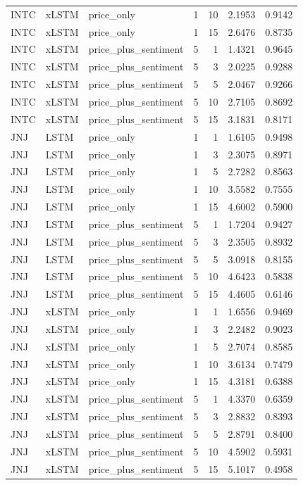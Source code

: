 \begin{longtable}{lllrrrr}
INTC & xLSTM & price_only & 1 & 10 & 2.1953 & 0.9142 \\
INTC & xLSTM & price_only & 1 & 15 & 2.6476 & 0.8735 \\
INTC & xLSTM & price_plus_sentiment & 5 & 1 & 1.4321 & 0.9645 \\
INTC & xLSTM & price_plus_sentiment & 5 & 3 & 2.0225 & 0.9288 \\
INTC & xLSTM & price_plus_sentiment & 5 & 5 & 2.0467 & 0.9266 \\
INTC & xLSTM & price_plus_sentiment & 5 & 10 & 2.7105 & 0.8692 \\
INTC & xLSTM & price_plus_sentiment & 5 & 15 & 3.1831 & 0.8171 \\
JNJ & LSTM & price_only & 1 & 1 & 1.6105 & 0.9498 \\
JNJ & LSTM & price_only & 1 & 3 & 2.3075 & 0.8971 \\
JNJ & LSTM & price_only & 1 & 5 & 2.7282 & 0.8563 \\
JNJ & LSTM & price_only & 1 & 10 & 3.5582 & 0.7555 \\
JNJ & LSTM & price_only & 1 & 15 & 4.6002 & 0.5900 \\
JNJ & LSTM & price_plus_sentiment & 5 & 1 & 1.7204 & 0.9427 \\
JNJ & LSTM & price_plus_sentiment & 5 & 3 & 2.3505 & 0.8932 \\
JNJ & LSTM & price_plus_sentiment & 5 & 5 & 3.0918 & 0.8155 \\
JNJ & LSTM & price_plus_sentiment & 5 & 10 & 4.6423 & 0.5838 \\
JNJ & LSTM & price_plus_sentiment & 5 & 15 & 4.4605 & 0.6146 \\
JNJ & xLSTM & price_only & 1 & 1 & 1.6556 & 0.9469 \\
JNJ & xLSTM & price_only & 1 & 3 & 2.2482 & 0.9023 \\
JNJ & xLSTM & price_only & 1 & 5 & 2.7074 & 0.8585 \\
JNJ & xLSTM & price_only & 1 & 10 & 3.6134 & 0.7479 \\
JNJ & xLSTM & price_only & 1 & 15 & 4.3181 & 0.6388 \\
JNJ & xLSTM & price_plus_sentiment & 5 & 1 & 4.3370 & 0.6359 \\
JNJ & xLSTM & price_plus_sentiment & 5 & 3 & 2.8832 & 0.8393 \\
JNJ & xLSTM & price_plus_sentiment & 5 & 5 & 2.8791 & 0.8400 \\
JNJ & xLSTM & price_plus_sentiment & 5 & 10 & 4.5902 & 0.5931 \\
JNJ & xLSTM & price_plus_sentiment & 5 & 15 & 5.1017 & 0.4958 \\

\end{longtable}
